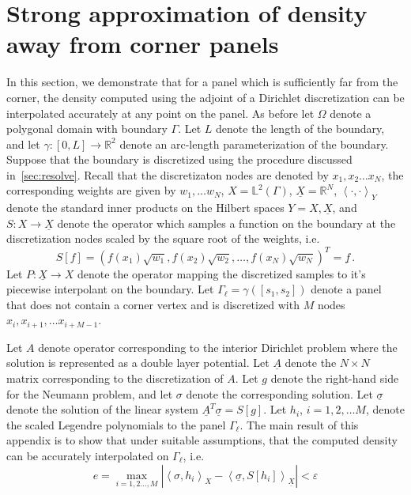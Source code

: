\documentclass[12pt,times]{elsarticle}
\newcommand{\uA}{\underline{A}}
\newcommand{\usigma}{\underline{\sigma}}
\newcommand{\uX}{\underline{X}}
\begin{document}
\section{Strong approximation of density away from corner panels}
\label{sec:appb}
{\color{blue}
In this section, we demonstrate that for a panel which is sufficiently far from the corner, the density computed using the adjoint of a Dirichlet discretization can be interpolated 
accurately at any point on the panel. As before let $\Omega$ denote a polygonal domain with boundary $\Gamma$. Let
$L$ denote the length of the boundary, and let $\gamma: [0,L]\to \mathbb{R}^2$ denote an arc-length parameterization of the boundary. Suppose that the boundary is discretized using the procedure discussed in~\cref{sec:resolve}. Recall that the discretizaton nodes are denoted by $x_{1},x_{2}\ldots x_{N}$, the corresponding weights are given by $w_{1}, \ldots w_{N}$, $X = \mathbb{L}^2({\Gamma})$, $\underline{X} = \mathbb{R}^{N}$, $\left< \cdot, \cdot \right>_{Y}$
denote the standard inner products on the Hilbert spaces $Y=X,\underline{X}$, and
$S:X \to \uX$ denote the operator which samples a function on the boundary at the discretization nodes scaled by the square root of the weights, i.e. 
\begin{equation}
S[f] = (f(x_{1})\sqrt{w_{1}},f(x_{2})\sqrt{w_{2}},\ldots, f(x_{N}) \sqrt{w_N} )^{T} = \underline{f} \, .
\end{equation}
Let $P:\underline{X} \to X$ denote the operator mapping the discretized samples to it's piecewise interpolant on the boundary.
Let $\Gamma_{\ell} = \gamma([s_{1},s_{2}])$ denote a panel that does not contain a corner vertex and is discretized with $M$ nodes  $x_{i},x_{i+1},\ldots x_{i+M-1}$.


Let $A$ denote operator corresponding to the interior Dirichlet problem where the solution is represented as a double layer potential. Let $\underline{A}$ denote the $N\times N$ matrix corresponding to the discretization of $A$. Let $g$ denote the
right-hand side for the Neumann problem, and let $\sigma$ denote the corresponding solution.   Let $\underline{\sigma}$ denote the solution of the linear system $\uA^{T} \usigma = S[g]$. Let $h_{i}$, $i=1,2,\ldots M$, denote the scaled Legendre polynomials to the panel $\Gamma_{\ell}$.
The main result of this appendix is to show that under suitable assumptions, that the computed density can be accurately interpolated on $\Gamma_{\ell}$, i.e.  
\begin{equation}
e = \max_{i=1,2\ldots, M} |\left< \sigma, h_{i} \right>_{X} -  \left< \usigma, S[h_{i}] \right>_{\uX}| < \varepsilon  
\end{equation}

}
\end{document}
